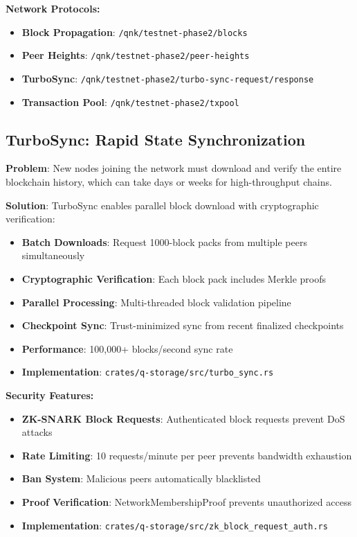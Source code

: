 \documentclass[11pt,a4paper]{scrartcl}
\begin{document}
\textbf{Network Protocols:}
\begin{itemize}
\item \textbf{Block Propagation}: \texttt{/qnk/testnet-phase2/blocks}
\item \textbf{Peer Heights}: \texttt{/qnk/testnet-phase2/peer-heights}
\item \textbf{TurboSync}: \texttt{/qnk/testnet-phase2/turbo-sync-request/response}
\item \textbf{Transaction Pool}: \texttt{/qnk/testnet-phase2/txpool}
\end{itemize}

\subsection{TurboSync: Rapid State Synchronization}

\textbf{Problem}: New nodes joining the network must download and verify the entire blockchain history, which can take days or weeks for high-throughput chains.

\textbf{Solution}: TurboSync enables parallel block download with cryptographic verification:

\begin{itemize}
\item \textbf{Batch Downloads}: Request 1000-block packs from multiple peers simultaneously
\item \textbf{Cryptographic Verification}: Each block pack includes Merkle proofs
\item \textbf{Parallel Processing}: Multi-threaded block validation pipeline
\item \textbf{Checkpoint Sync}: Trust-minimized sync from recent finalized checkpoints
\item \textbf{Performance}: 100,000+ blocks/second sync rate
\item \textbf{Implementation}: \texttt{crates/q-storage/src/turbo\_sync.rs}
\end{itemize}

\textbf{Security Features:}
\begin{itemize}
\item \textbf{ZK-SNARK Block Requests}: Authenticated block requests prevent DoS attacks
\item \textbf{Rate Limiting}: 10 requests/minute per peer prevents bandwidth exhaustion
\item \textbf{Ban System}: Malicious peers automatically blacklisted
\item \textbf{Proof Verification}: NetworkMembershipProof prevents unauthorized access
\item \textbf{Implementation}: \texttt{crates/q-storage/src/zk\_block\_request\_auth.rs}
\end{itemize}
\end{document}
